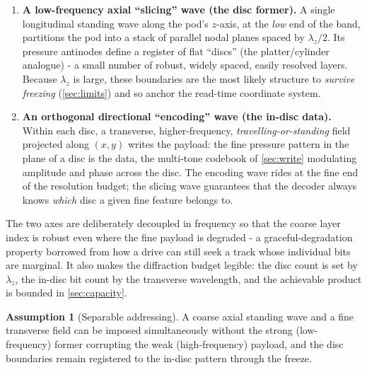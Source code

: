 \documentclass[11pt]{article}
\theoremstyle{definition}
\newtheorem{assumption}{Assumption}
\begin{document}
\begin{enumerate}[leftmargin=1.6em,nosep]
  \item \textbf{A low-frequency axial ``slicing'' wave (the disc former).} A single
  longitudinal standing wave along the pod's $z$-axis, at the \emph{low} end of the band,
  partitions the pod into a stack of parallel nodal planes spaced by $\lambda_z/2$. Its
  pressure antinodes define a register of flat ``discs'' (the platter/cylinder analogue) -
  a small number of robust, widely spaced, easily resolved layers. Because $\lambda_z$ is
  large, these boundaries are the most likely structure to \emph{survive freezing}
  (\cref{sec:limits}) and so anchor the read-time coordinate system.
  \item \textbf{An orthogonal directional ``encoding'' wave (the in-disc data).} Within each
  disc, a transverse, higher-frequency, \emph{travelling-or-standing} field projected along
  $(x,y)$ writes the payload: the fine pressure pattern in the plane of a disc is the data,
  the multi-tone codebook of \cref{sec:write} modulating amplitude and phase across the
  disc. The encoding wave rides at the fine end of the resolution budget; the slicing wave
  guarantees that the decoder always knows \emph{which} disc a given fine feature belongs
  to.
\end{enumerate}

The two axes are deliberately decoupled in frequency so that the coarse layer index is
robust even where the fine payload is degraded - a graceful-degradation property borrowed
from how a drive can still seek a track whose individual bits are marginal. It also makes
the diffraction budget legible: the disc count is set by $\lambda_z$, the in-disc bit count
by the transverse wavelength, and the achievable product is bounded in \cref{sec:capacity}.

\begin{assumption}[Separable addressing]\label{as:biaxial}
A coarse axial standing wave and a fine transverse field can be imposed simultaneously
without the strong (low-frequency) former corrupting the weak (high-frequency) payload, and
the disc boundaries remain registered to the in-disc pattern through the freeze.
\end{assumption}
\end{document}
